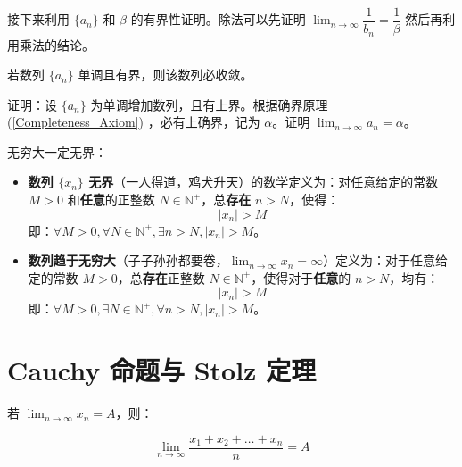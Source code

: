 接下来利用 $\displaystyle \lbrace a_n \rbrace$ 和 $\beta$ 的有界性证明。除法可以先证明 $\displaystyle \lim_{n \to \infty} \dfrac{1}{b_n} = \dfrac{1}{\beta}$ 然后再利用乘法的结论。

\begin{definition}[单调有界原理]

若数列 $\displaystyle \lbrace a_n \rbrace$ 单调且有界，则该数列必收敛。

\end{definition}

证明：设 $\displaystyle \lbrace a_n \rbrace$ 为单调增加数列，且有上界。根据确界原理 (\ref{Completeness_Axiom}) ，必有上确界，记为 $\displaystyle {\alpha}$。证明 $\displaystyle \lim_{n \to \infty} a_n = {\alpha}$。

\begin{theorem}[数列无尽和无穷大的定义]

无穷大一定无界：

\begin{itemize}
  \item {\textbf{数列 $\displaystyle \lbrace x_n \rbrace$ 无界}（一人得道，鸡犬升天）的数学定义为：对任意给定的常数 $\displaystyle M > 0$ 和\textbf{任意}的正整数 $\displaystyle N \in \mathbb{N}^+$，总\textbf{存在} $\displaystyle n > N$，使得：$$
\displaystyle \vert x_n \vert > M$$
即：$\displaystyle \forall M > 0, \forall N \in \mathbb{N}^+,  \exists  n > N, \vert x_n \vert > M$。}\item {\textbf{数列趋于无穷大}（子子孙孙都要卷，$\displaystyle \lim_{n \to \infty} x_n = \infty$）定义为：对于任意给定的常数 $\displaystyle M > 0$，总\textbf{存在}正整数 $\displaystyle N \in \mathbb{N}^+$，使得对于\textbf{任意}的 $\displaystyle n > N$，均有：\begin{equation}\displaystyle \vert x_n \vert > M\end{equation}即：$\displaystyle \forall M > 0, \exists N \in \mathbb{N}^+, \forall n > N, \vert x_n \vert > M$。}
\end{itemize}

\end{theorem}

\section{Cauchy 命题与 Stolz 定理}

\begin{theorem}

\label{Cauchythm}若 $\displaystyle \lim_{n \to \infty} x_n = A$，则：

\begin{equation}
\displaystyle \lim_{n \to \infty} \dfrac{x_1 + x_2 + \dots + x_n}{n} = A
\end{equation}

\end{theorem}

